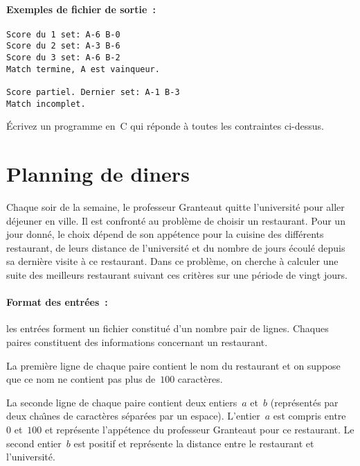 \paragraph{Exemples de fichier de sortie~:}
\begin{verbatim}
Score du 1 set: A-6 B-0
Score du 2 set: A-3 B-6
Score du 3 set: A-6 B-2
Match termine, A est vainqueur.

Score partiel. Dernier set: A-1 B-3
Match incomplet.
\end{verbatim}
\par\bigskip
\'Ecrivez un programme en~C  qui r\'eponde \`a toutes les  contraintes
ci-dessus.

\section{Planning de diners}
\label{sec:PlanningDeDiners}
Chaque soir   de      la semaine, le     professeur   Granteaut quitte
l'universit\'e pour  aller d\'ejeuner en  ville. Il est confront\'e au
probl\`eme  de choisir un restaurant.  Pour  un jour donn\'e, le choix
d\'epend  de   son  app\'etence  pour    la  cuisine  des diff\'erents
restaurant, de leurs distance de l'universit\'e  et du nombre de jours
\'ecoul\'e depuis  sa derni\`ere  visite  \`a ce  restaurant. Dans  ce
probl\`eme, on cherche \`a calculer une suite des meilleurs restaurant
suivant ces crit\`eres sur une p\'eriode de vingt jours.

\paragraph{Format des entr\'ees~:}
les entr\'ees forment un fichier constitu\'e d'un nombre pair de lignes. Chaques paires constituent des informations concernant un restaurant.
\par
La premi\`ere ligne de chaque paire contient le nom du restaurant et on suppose que ce nom ne contient pas plus de~$100$ caract\`eres.
\par
La seconde ligne de    chaque paire contient deux  entiers~$a$  et~$b$
(repr\'esent\'es par  deux  cha\^\i{}nes de  caract\`eres s\'epar\'ees
par  un espace).    L'entier~$a$ est compris   entre~$0$   et~$100$ et
repr\'esente l'app\'etence du professeur Granteaut pour ce restaurant.
Le second entier~$b$ est positif et repr\'esente  la distance entre le
restaurant et l'universit\'e.
